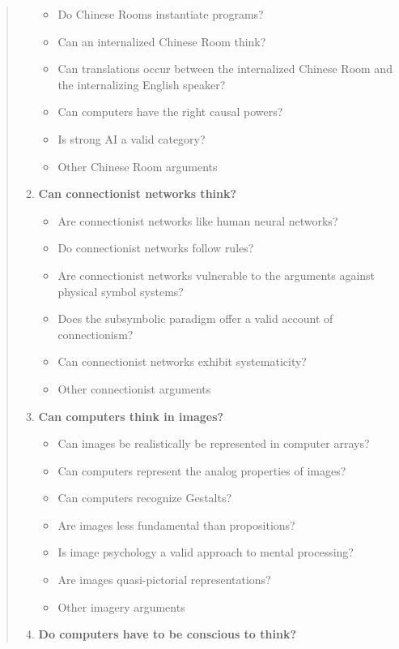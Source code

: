 \begin{quotation}
\begin{enumerate}
\begin{itemize}
        \item Do Chinese Rooms instantiate programs?
        \item Can an internalized Chinese Room think?
        \item Can translations occur between the internalized Chinese Room and the internalizing English speaker?
        \item Can computers have the right causal powers?
        \item Is strong AI a valid category?
        \item Other Chinese Room arguments
      \end{itemize}
    \item \textbf{Can connectionist networks think?}
      \begin{itemize}
        \item Are connectionist networks like human neural networks?
        \item Do connectionist networks follow rules?
        \item Are connectionist networks vulnerable to the arguments against physical symbol systems?
        \item Does the subsymbolic paradigm offer a valid account of connectionism?
        \item Can connectionist networks exhibit systematicity?
        \item Other connectionist arguments
      \end{itemize}
    \item \textbf{Can computers think in images?}
      \begin{itemize}
        \item Can images be realistically be represented in computer arrays?
        \item Can computers represent the analog properties of images?
        \item Can computers recognize Gestalts?
        \item Are images less fundamental than propositions?
        \item Is image psychology a valid approach to mental processing?
        \item Are images quasi-pictorial representations?
        \item Other imagery arguments
      \end{itemize}
    \item \textbf{Do computers have to be conscious to think?}
      \begin{itemize}

\end{itemize}
\end{enumerate}
\end{quotation}
